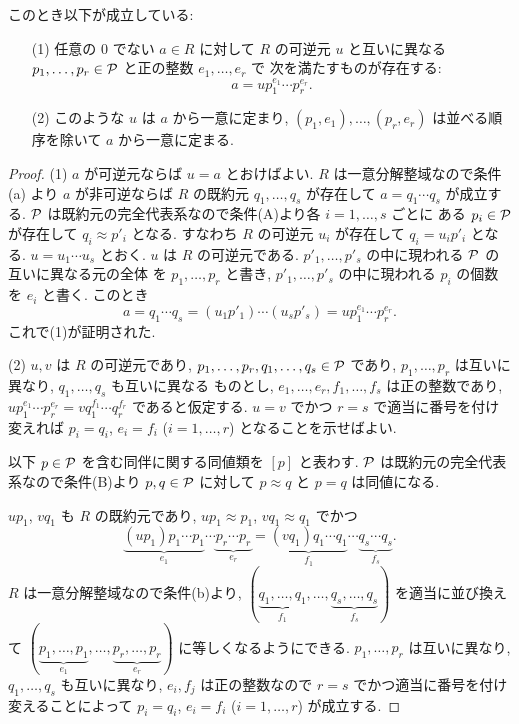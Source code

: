 \documentclass[12pt,twoside]{jarticle}
\begin{document}
\begin{theorem}
\label{theorem:1}
このとき以下が成立している:
\begin{enumerate}
 \item[(1)] 任意の $0$ でない $a\in R$ に対して $R$ の可逆元 $u$ 
  と互いに異なる $p_1,\ldots,p_r\in{\mathcal P}$ と正の整数 $e_1,\dots,e_r$ で
  次を満たすものが存在する:
  \begin{equation*}
   a = u p_1^{e_1} \cdots p_r^{e_r}.
  \end{equation*}
 \item[(2)] このような $u$ は $a$ から一意に定まり, 
  $(p_1,e_1),\ldots,(p_r,e_r)$ は並べる順序を除いて $a$ から一意に定まる.
\end{enumerate}
\end{theorem}

\begin{proof}
(1) $a$ が可逆元ならば $u=a$ とおけばよい. 
$R$ は一意分解整域なので条件 (a) より $a$ が非可逆ならば $R$ の既約元 %
$q_1,\ldots,q_s$ が存在して $a=q_1\cdots q_s$ が成立する.
${\mathcal P}$ は既約元の完全代表系なので条件(A)より各 $i=1,\ldots,s$ ごとに
ある $p_i\in{\mathcal P}$ が存在して $q_i\approx p'_i$ となる.
すなわち $R$ の可逆元 $u_i$ が存在して $q_i=u_ip'_i$ となる.
$u=u_1\cdots u_s$ とおく. $u$ は $R$ の可逆元である.
$p'_1,\ldots,p'_s$ の中に現われる ${\mathcal P}$ の互いに異なる元の全体
を $p_1,\ldots,p_r$ と書き, 
$p'_1,\ldots,p'_s$ の中に現われる $p_i$ の個数を $e_i$ と書く.
このとき
\begin{equation*}
 a
 =q_1\cdots q_s
 =(u_1p'_1)\cdots(u_sp'_s)
 =u p_1^{e_1}\cdots p_r^{e_r}.
\end{equation*}
これで(1)が証明された.

(2) $u,v$ は $R$ の可逆元であり, $p_1,\ldots,p_r,q_1,\ldots,q_s\in{\mathcal P}$
であり, $p_1,\ldots,p_r$ は互いに異なり, $q_1,\ldots,q_s$ も互いに異なる
ものとし, $e_1,\ldots,e_r,f_1,\ldots,f_s$ は正の整数であり, %
$up_1^{e_1}\cdots p_r^{e_r} = vq_1^{f_1}\cdots q_r^{f_r}$ であると仮定する.
$u=v$ でかつ $r=s$ で適当に番号を付け変えれば $p_i=q_i$, $e_i=f_i$ 
($i=1,\ldots,r$) となることを示せばよい.

以下 $p\in{\mathcal P}$ を含む同伴に関する同値類を $[p]$ と表わす.
${\mathcal P}$ は既約元の完全代表系なので条件(B)より %
$p,q\in{\mathcal P}$ に対して $p\approx q$ と $p=q$ は同値になる.

$up_1$, $vq_1$ も $R$ の既約元であり, 
$up_1\approx p_1$, $vq_1\approx q_1$ でかつ
\begin{equation*}
 \underbrace{(up_1)p_1\cdots p_1}_{e_1}\cdots\underbrace{p_r\cdots p_r}_{e_r}
 =
 \underbrace{(vq_1)q_1\cdots q_1}_{f_1}\cdots\underbrace{q_s\cdots q_s}_{f_s}.
\end{equation*}
$R$ は一意分解整域なので条件(b)より, \(
 (\underbrace{q_1,\ldots,q_1}_{f_1},
 \ldots,\underbrace{q_s,\ldots,q_s}_{f_s})
\) を適当に並び換えて \(
(\underbrace{p_1,\ldots,p_1}_{e_1},
\ldots,\underbrace{p_r,\ldots,p_r}_{e_r})
\) に等しくなるようにできる. $p_1,\ldots,p_r$ は互いに異なり, 
$q_1,\ldots,q_s$ も互いに異なり, $e_i,f_j$ は正の整数なので %
$r=s$ でかつ適当に番号を付け変えることによって $p_i=q_i$, $e_i=f_i$
($i=1,\ldots,r$) が成立する. 


\end{proof}
\end{document}
